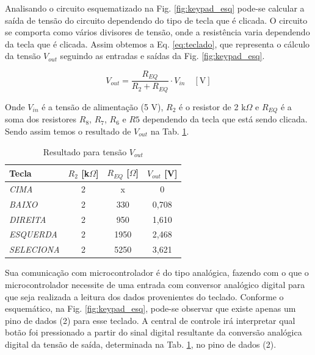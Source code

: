         Analisando o circuito esquematizado na Fig. \ref{fig:keypad_esq} pode-se calcular a saída de tensão do circuito dependendo do tipo de tecla que é clicada. O circuito se comporta como vários divisores de tensão, onde a resistência varia dependendo da tecla que é clicada. Assim obtemos a Eq. \ref{eq:teclado}, que representa o cálculo da tensão $V_{out}$ seguindo as entradas e saídas da Fig. \ref{fig:keypad_esq}.
        
        \begin{equation}\label{eq:teclado}
            V_{out} = \frac{R_{EQ}}{R_2 + R_{EQ}} \cdot V_{in} \quad [\text{V}]
        \end{equation}
        
        Onde $V_{in}$ é a tensão de alimentação (5 V), $R_2$ é o resistor de 2 k$\Omega$ e $R_{EQ}$ é a soma dos resistores $R_8$, $R_7$, $R_6$ e $R5$ dependendo da tecla que está sendo clicada. Sendo assim temos o resultado de $V_{out}$ na Tab. \ref{tab:teclado}.
        
        \begin{table}[H]
        \centering
        \caption{Resultado para tensão $V_{out}$}
        \label{tab:teclado}
        \begin{adjustbox}{max width = \textwidth}
            \begin{tabular}{|l|c|c|c|}
                \hline
                \rowcolor[HTML]{A8DADC}
                \textbf{Tecla} & $R_2$ [k$\Omega$] & $R_{EQ}$ [$\Omega$] & $V_{out}$ [V] \\ \hline
                \textit{CIMA} & 2 & x & 0 \\ \hline
                \textit{BAIXO} & 2 & 330  & 0,708 \\ \hline
                \textit{DIREITA} & 2 & 950 & 1,610 \\ \hline
                \textit{ESQUERDA} & 2 & 1950 & 2,468 \\ \hline
                \textit{SELECIONA} & 2 & 5250 & 3,621 \\ \hline
            \end{tabular}
        \end{adjustbox}
        \end{table}
            
        Sua comunicação com microcontrolador é do tipo analógica, fazendo com o que o microcontrolador necessite de uma entrada com conversor analógico digital para que seja realizada a leitura dos dados provenientes do teclado. Conforme o esquemático, na Fig. \ref{fig:keypad_esq}, pode-se observar que existe apenas um pino de dados (2) para esse teclado. A central de controle irá interpretar qual botão foi pressionado a partir do sinal digital resultante da conversão analógica digital da tensão de saída, determinada na Tab. \ref{tab:teclado}, no pino de dados (2). 
        

